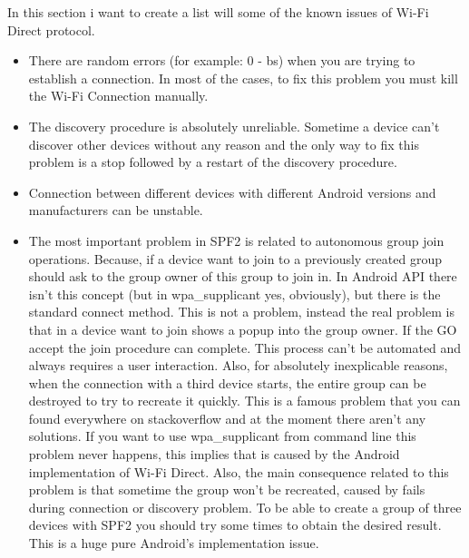 In this section i want to create a list will some of the known issues of Wi-Fi Direct protocol.
\begin{itemize}
	\item There are random errors (for example: 0 - bs) when you are trying to establish a connection. In most of the cases, to fix this problem you must kill the Wi-Fi Connection manually.
	\item The discovery procedure is absolutely unreliable. Sometime a device can't discover other devices without any reason and the only way to fix this problem is a stop followed by a restart of the discovery procedure.
	\item Connection between different devices with different Android versions and manufacturers can be unstable.
	\item The most important problem in SPF2 is related to autonomous group join operations. Because, if a device want to join to a previously created group should ask to the group owner of this group to join in. In Android API there isn't this concept (but in wpa\_supplicant yes, obviously), but there is the standard connect method. This is not a problem, instead the real problem is that in a device want to join shows a popup into the group owner. If the GO accept the join procedure can complete. This process can't be automated and always requires a user interaction. Also, for absolutely inexplicable reasons, when the connection with a third device starts, the entire group can be destroyed to try to recreate it quickly. This is a famous problem that you can found everywhere on stackoverflow and at the moment there aren't any solutions. If you want to use wpa\_supplicant from command line this problem never happens, this implies that is caused by the Android implementation of Wi-Fi Direct. Also, the main consequence related to this problem is that sometime the group won't be recreated, caused by fails during connection or discovery problem. To be able to create a group of three devices with SPF2 you should try some times to obtain the desired result. This is a huge pure Android's implementation issue.
\end{itemize}



